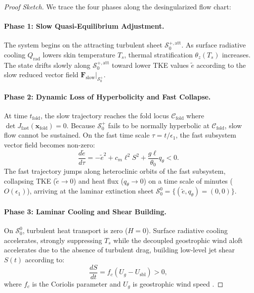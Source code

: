 \begin{proof}[Proof Sketch]
We trace the four phases along the desingularized flow chart:
\paragraph{Phase 1: Slow Quasi-Equilibrium Adjustment.}
The system begins on the attracting turbulent sheet $\mathcal{S}_0^{+,\mathrm{att}}$. As surface radiative cooling $Q_{\mathrm{rad}}$ lowers skin temperature $T_s$, thermal stratification $\theta_z(T_s)$ increases. The state drifts slowly along $\mathcal{S}_0^{+,\mathrm{att}}$ toward lower TKE values $\tilde e$ according to the slow reduced vector field $\mathbf{F}_{\mathrm{slow}}\vert_{\mathcal{S}_0^+}$.

\paragraph{Phase 2: Dynamic Loss of Hyperbolicity and Fast Collapse.}
At time $t_{\mathrm{fold}}$, the slow trajectory reaches the fold locus $\mathcal{C}_{\mathrm{fold}}$ where $\det J_{\mathrm{fast}}(\mathbf{x}_{\mathrm{fold}}) = 0$. Because $\mathcal{S}_0^+$ fails to be normally hyperbolic at $\mathcal{C}_{\mathrm{fold}}$, slow flow cannot be sustained. On the fast time scale $\tau = t / \epsilon_1$, the fast subsystem vector field becomes non-zero:
\begin{equation}
\frac{d\tilde e}{d\tau} = -\tilde e^2 + c_m \ell^2 S^2 + \frac{g\ell}{\theta_0}q_\theta < 0.
\end{equation}
The fast trajectory jumps along heteroclinic orbits of the fast subsystem, collapsing TKE ($\tilde e \to 0$) and heat flux ($q_\theta \to 0$) on a time scale of minutes ($O(\epsilon_1)$), arriving at the laminar extinction sheet $\mathcal{S}_0^0 = \{(\tilde e, q_\theta) = (0,0)\}$.

\paragraph{Phase 3: Laminar Cooling and Shear Building.}
On $\mathcal{S}_0^0$, turbulent heat transport is zero ($H = 0$). Surface radiative cooling accelerates, strongly suppressing $T_s$ while the decoupled geostrophic wind aloft accelerates due to the absence of turbulent drag, building low-level jet shear $S(t)$ according to:
\begin{equation}
\frac{dS}{dt} = f_c (U_g - U_{\mathrm{sbl}}) > 0,
\end{equation}
where $f_c$ is the Coriolis parameter and $U_g$ is geostrophic wind speed \citep{Blackadar1957, VanDeWiel2010}.


\end{proof}
